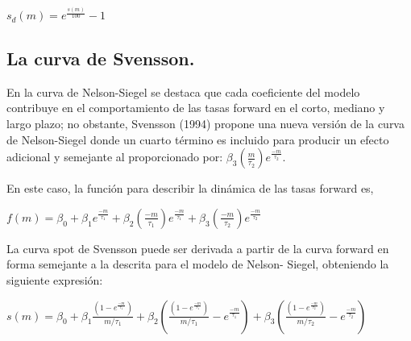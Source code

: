 \begin{center}
$\displaystyle{s_{d}(m) = e^{\frac{s(m)}{100}} - 1}$
\end{center}

\subsection{La curva de Svensson.\\}

\hspace*{0.4 cm} En la curva de Nelson-Siegel se destaca que cada coeficiente del modelo
contribuye en el comportamiento de las tasas forward en el corto,
mediano y largo plazo; no obstante, Svensson (1994) propone una nueva
versi\'on de la curva de Nelson-Siegel donde un cuarto t\'ermino es incluido
para producir un efecto adicional y semejante al proporcionado por:
$\beta_{3}(\frac{m}{\tau_{2}})e^{\frac{-m}{\tau_{2}}}$.

\hspace*{0.4 cm} En este caso, la funci\'on para describir la din\'amica de las tasas forward es,

\vspace*{0.2 cm}

\begin{center}
$\displaystyle{f(m) = \beta_{0} + \beta_{1} e^{\frac{-m}{\tau_{1}}} +\beta_{2} \left(\frac{-m}{\tau_{1}}\right)e^{\frac{-m}{\tau_{1}}} + \beta_{3}\left(\frac{-m}{\tau_{2}}\right)e^{\frac{-m}{\tau_{2}}} }$
\end{center}

\vspace*{0.2 cm}

\hspace*{0.4 cm} La curva spot de Svensson puede ser derivada a partir de la curva
forward en forma semejante a la descrita para el modelo de Nelson-
Siegel, obteniendo la siguiente expresi\'on:

\vspace*{0.2 cm}

\begin{center}
$\displaystyle{s(m) = \beta_{0}+ \beta_{1}\frac{\left(1-e^\frac{-m}{\tau_{1}}\right)}{m/\tau_{1}} + \beta_{2} \left(\frac{\left(1-e^\frac{-m}{\tau_{1}}\right)}{m/\tau_{1}} -  e^\frac{-m}{\tau_{1}}\right) + \beta_{3} \left(\frac{\left(1-e^\frac{-m}{\tau_{2}}\right)}{m/\tau_{2}} -  e^\frac{-m}{\tau_{2}}\right)}$
\end{center}

\vspace*{0.2 cm}

